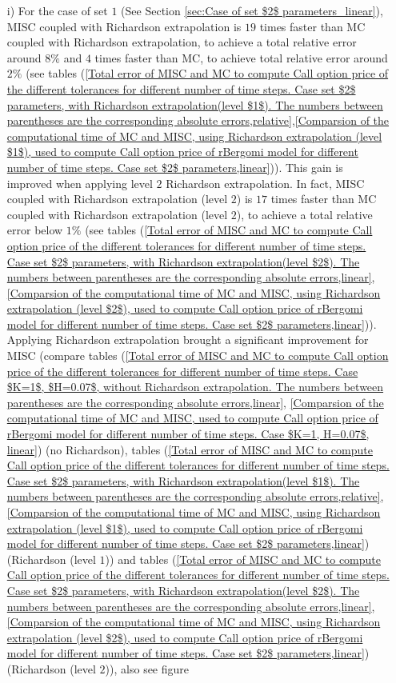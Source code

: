 \begin{enumerate}
			\item [i)] For the case of set $1$ (See Section \ref{sec:Case of set $2$ parameters_linear}), MISC coupled with Richardson extrapolation is $19$ times faster than MC coupled with Richardson extrapolation, to achieve a total relative error around $8\%$ and $4$ times faster than MC, to achieve total relative error around $2\%$ (see tables (\ref{Total  error of MISC and MC to compute Call option price of the different tolerances for different number of time steps. Case set $2$ parameters, with Richardson extrapolation(level $1$). The numbers between parentheses are the corresponding absolute errors,relative},\ref{Comparsion of the computational time of  MC and MISC, using Richardson extrapolation (level $1$), used to compute Call option price of rBergomi model for different number of time steps. Case set $2$ parameters,linear})). This gain is improved when applying level $2$ Richardson extrapolation. In fact,  MISC coupled with Richardson extrapolation (level $2$) is $17$ times faster than MC coupled with Richardson extrapolation (level $2$), to achieve a total relative error below  $1\%$ (see  tables (\ref{Total  error of MISC and MC to compute Call option price of the different tolerances for different number of time steps. Case set $2$ parameters, with Richardson extrapolation(level $2$). The numbers between parentheses are the corresponding absolute errors,linear}, \ref{Comparsion of the computational time of  MC and MISC, using Richardson extrapolation (level $2$), used to compute Call option price of rBergomi model for different number of time steps. Case set $2$ parameters,linear})). Applying Richardson extrapolation brought a significant improvement for MISC (compare tables (\ref{Total error of MISC and MC to compute Call option price of the different tolerances for different number of time steps. Case $K=1$, $H=0.07$, without Richardson extrapolation. The numbers between parentheses are the corresponding absolute errors,linear}, \ref{Comparsion of the computational time of  MC and MISC, used to compute Call option price of rBergomi model for different number of time steps. Case $K=1, H=0.07$, linear}) (no Richardson), tables (\ref{Total  error of MISC and MC to compute Call option price of the different tolerances for different number of time steps. Case set $2$ parameters, with Richardson extrapolation(level $1$). The numbers between parentheses are the corresponding absolute errors,relative},\ref{Comparsion of the computational time of  MC and MISC, using Richardson extrapolation (level $1$), used to compute Call option price of rBergomi model for different number of time steps. Case set $2$ parameters,linear}) (Richardson (level $1$)) and  tables  (\ref{Total  error of MISC and MC to compute Call option price of the different tolerances for different number of time steps. Case set $2$ parameters, with Richardson extrapolation(level $2$). The numbers between parentheses are the corresponding absolute errors,linear}, \ref{Comparsion of the computational time of  MC and MISC, using Richardson extrapolation (level $2$), used to compute Call option price of rBergomi model for different number of time steps. Case set $2$ parameters,linear}) (Richardson (level $2$)), also see  figure 
\end{enumerate}
